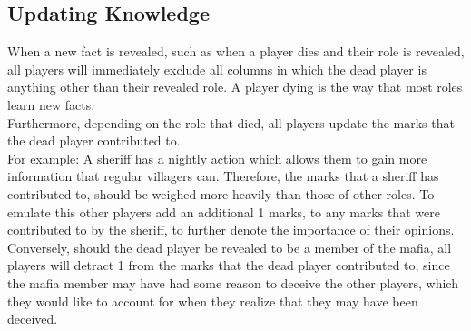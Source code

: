 \subsection{Updating Knowledge}\label{UpdatingKnowledge}
When a new fact is revealed, such as when a player dies and their role is 
revealed, all players will immediately exclude all columns in which the dead 
player is anything other than their revealed role. A player dying is the way 
that most roles learn new facts.\\
Furthermore, depending on the role that died, all players update the marks that 
the dead player contributed to.\\
For example: A sheriff has a nightly action which allows them to gain more 
information that regular villagers can. Therefore, the marks that a sheriff has 
contributed to, should be weighed more heavily than those of other roles. To 
emulate this other players add an additional 1 marks, to any marks that were 
contributed to by the sheriff, to further denote the importance of their 
opinions. \\
Conversely, should the dead player be revealed to be a member of the mafia, all 
players will detract 1 from the marks that the dead player contributed to, 
since the mafia member may have had some reason to deceive the other players, 
which they would like to account for when they realize that they may have been 
deceived. 
